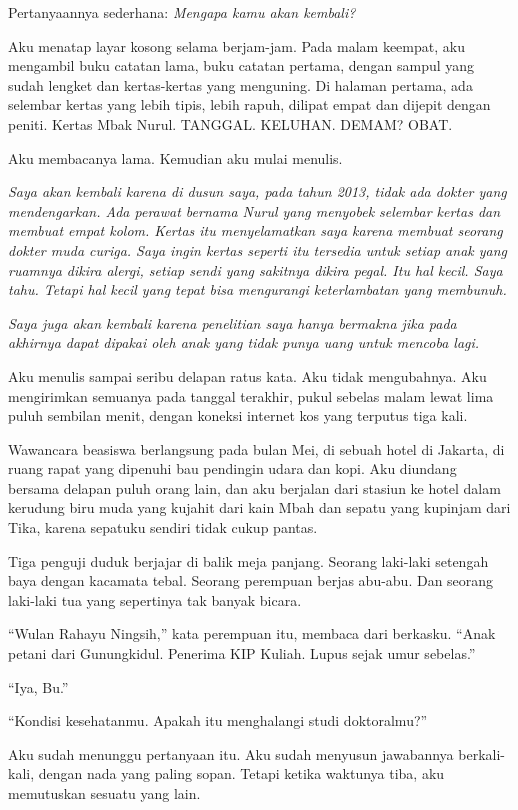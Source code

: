 \documentclass[11pt,twoside,openany]{book}
\makeatletter
\newcommand{\scenebreak}{\par\vspace{0.9em}{\centering\textsc{*\hspace{0.7em}*\hspace{0.7em}*}\par}\vspace{0.9em}\@afterindentfalse\@afterheading}
\makeatother
\begin{document}
Pertanyaannya sederhana: \emph{Mengapa kamu akan kembali?}

Aku menatap layar kosong selama berjam-jam. Pada malam keempat, aku mengambil buku catatan lama, buku catatan pertama, dengan sampul yang sudah lengket dan kertas-kertas yang menguning. Di halaman pertama, ada selembar kertas yang lebih tipis, lebih rapuh, dilipat empat dan dijepit dengan peniti. Kertas Mbak Nurul. TANGGAL. KELUHAN. DEMAM? OBAT.

Aku membacanya lama. Kemudian aku mulai menulis.

\emph{Saya akan kembali karena di dusun saya, pada tahun 2013, tidak ada dokter yang mendengarkan. Ada perawat bernama Nurul yang menyobek selembar kertas dan membuat empat kolom. Kertas itu menyelamatkan saya karena membuat seorang dokter muda curiga. Saya ingin kertas seperti itu tersedia untuk setiap anak yang ruamnya dikira alergi, setiap sendi yang sakitnya dikira pegal. Itu hal kecil. Saya tahu. Tetapi hal kecil yang tepat bisa mengurangi keterlambatan yang membunuh.}

\emph{Saya juga akan kembali karena penelitian saya hanya bermakna jika pada akhirnya dapat dipakai oleh anak yang tidak punya uang untuk mencoba lagi.}

Aku menulis sampai seribu delapan ratus kata. Aku tidak mengubahnya. Aku mengirimkan semuanya pada tanggal terakhir, pukul sebelas malam lewat lima puluh sembilan menit, dengan koneksi internet kos yang terputus tiga kali.

\scenebreak
Wawancara beasiswa berlangsung pada bulan Mei, di sebuah hotel di Jakarta, di ruang rapat yang dipenuhi bau pendingin udara dan kopi. Aku diundang bersama delapan puluh orang lain, dan aku berjalan dari stasiun ke hotel dalam kerudung biru muda yang kujahit dari kain Mbah dan sepatu yang kupinjam dari Tika, karena sepatuku sendiri tidak cukup pantas.

Tiga penguji duduk berjajar di balik meja panjang. Seorang laki-laki setengah baya dengan kacamata tebal. Seorang perempuan berjas abu-abu. Dan seorang laki-laki tua yang sepertinya tak banyak bicara.

``Wulan Rahayu Ningsih,'' kata perempuan itu, membaca dari berkasku. ``Anak petani dari Gunungkidul. Penerima KIP Kuliah. Lupus sejak umur sebelas.''

``Iya, Bu.''

``Kondisi kesehatanmu. Apakah itu menghalangi studi doktoralmu?''

Aku sudah menunggu pertanyaan itu. Aku sudah menyusun jawabannya berkali-kali, dengan nada yang paling sopan. Tetapi ketika waktunya tiba, aku memutuskan sesuatu yang lain.
\end{document}
